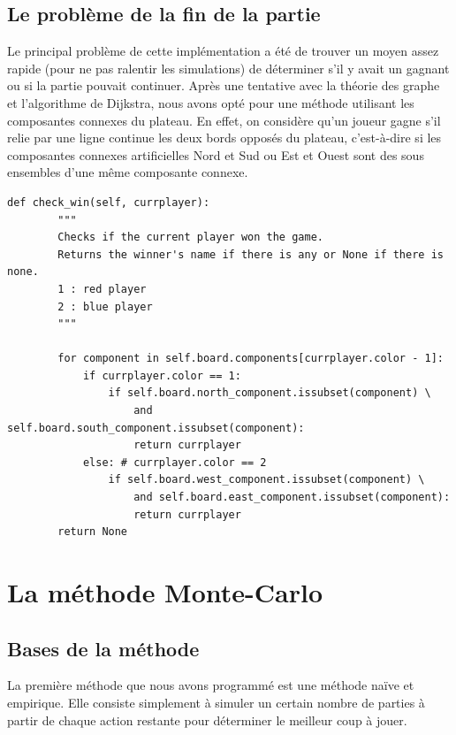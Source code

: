 \documentclass[a4paper]{article}
\theoremstyle{definition}
\begin{document}
\subsection{Le problème de la fin de la partie}

Le principal problème de cette implémentation a été de trouver un moyen assez rapide (pour ne pas ralentir les simulations) de déterminer s'il y avait un gagnant ou si la partie pouvait continuer. Après une tentative avec la théorie des graphe et l'algorithme de Dijkstra, nous avons opté pour une méthode utilisant les composantes connexes du plateau. En effet, on considère qu'un joueur gagne s'il relie par une ligne continue les deux bords opposés du plateau, c'est-à-dire si les composantes connexes artificielles Nord et Sud ou Est et Ouest sont des sous ensembles d'une même composante connexe.

\begin{lstlisting}
def check_win(self, currplayer):
        """
        Checks if the current player won the game. 
        Returns the winner's name if there is any or None if there is none.
        1 : red player
        2 : blue player
        """

        for component in self.board.components[currplayer.color - 1]:
            if currplayer.color == 1:
                if self.board.north_component.issubset(component) \
                    and self.board.south_component.issubset(component):
                    return currplayer
            else: # currplayer.color == 2
                if self.board.west_component.issubset(component) \
                    and self.board.east_component.issubset(component):
                    return currplayer
        return None
\end{lstlisting}


\clearpage

\section{La méthode Monte-Carlo}

\subsection{Bases de la méthode}

La première méthode que nous avons programmé est une méthode naïve et empirique. Elle consiste simplement à simuler un certain nombre de parties à partir de chaque action restante pour déterminer le meilleur coup à jouer.
\end{document}
